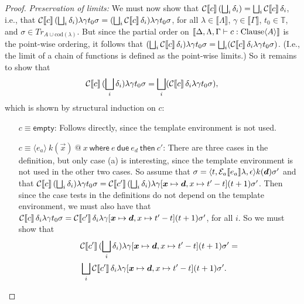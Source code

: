 \documentclass[orivec,final]{llncs-href}
\makeatletter
\newcommand{\timeset}{\mathbb{T}}
\newcommand{\traceset}[1]{\mathit{Tr}_{#1}}
\newcommand{\cod}[1]{\mathrm{cod}(#1)}
\newcommand{\dendom}[1]{\llbracket #1 \rrbracket}
\newcommand{\trace}{\sigma}
\newcommand{\emptychoice}{\epsilon}
\newcommand{\event}[3]{\langle #1,#2,#3\rangle}
\newcommand{\cempty}{\mathsf{empty}}
\newcommand{\catomic}[6]{\langle#1\rangle\ #2\ \textsf{@}\ #3\
  \mathsf{where}\ #4\ \mathsf{due}\ #5\ \mathsf{then}\ #6}
\makeatother
\begin{document}
\begin{proof}
  \emph{Preservation of limits:}
  We must now show that $\mathcal{C}\!\left\llbracket c \right\rrbracket (\bigsqcup_i
    \delta_i)    = \bigsqcup_i\mathcal{C}\!\left\llbracket c \right\rrbracket \delta_i   $,
  i.e., that $\cdenclause{c}{(\bigsqcup_i
    \delta_i)}{\lambda}{\gamma}{t_0}{\trace} = (\bigsqcup_i
  \cdenclause{c}{\delta_i)}{\lambda}{\gamma}{t_0}{\trace}$, for all
  $\lambda \in \dendom{\Lambda}$, $\gamma \in \dendom{\Gamma}$, $t_0
  \in \timeset$, and $\trace \in \traceset{A \cup \cod{\lambda}}$. But since
  the partial order on $\dendom{\ctclause{\Delta}{\Lambda}{\Gamma}{c}{A}}$ is
  the point-wise ordering, it follows that $(\bigsqcup_i
  \cdenclause{c}{\delta_i)}{\lambda}{\gamma}{t_0}{\trace} = \bigsqcup_i
  (\cdenclause{c}{\delta_i}{\lambda}{\gamma}{t_0}{\trace})$. (I.e., the
  limit of a chain of functions is defined as the point-wise limits.) So
  it remains to show that
  \[
  \cdenclause{c}{(\bigsqcup_i
    \delta_i)}{\lambda}{\gamma}{t_0}{\trace} = \bigsqcup_i
  (\cdenclause{c}{\delta_i}{\lambda}{\gamma}{t_0}{\trace}),
  \]
  which is shown by structural induction on $c$:
  \begin{itemize}\itemsep=5pt
  \item[$c \equiv \cempty$:]
    Follows directly, since the template environment is not used.
  \item[$c \equiv \catomic{e_a}{k(\vec{x})}{x}{e}{e_d}{c'}$:]
    There are three cases in the definition, but only case (a) is
    interesting, since the template environment is not used in the other
    two cases. So assume that $\trace =
    \event{t}{\cdenaexp{e_a}{\lambda}}{\emptychoice}{k(\vec{d})}\trace'$
    and that $\cdenclause{c}{(\bigsqcup_i
      \delta_i)}{\lambda}{\gamma}{t_0}{\trace} =
    \cdenclause{c'}{(\bigsqcup_i \delta_i)}{\lambda}{\gamma[\vec{x}
      \mapsto \vec{d}, x \mapsto t' - t]}{(t+1)}{\trace'}$. Then since the
    case tests in the definitions do not depend on the template
    environment, we must also have that
    $\cdenclause{c}{\delta_i}{\lambda}{\gamma}{t_0}{\trace} =
    \cdenclause{c'}{\delta_i}{\lambda}{\gamma[\vec{x} \mapsto \vec{d},
      x \mapsto t' - t]}{(t+1)}{\trace'}$, for all $i$. So we 
    must show that
    \begin{align*}
      &\cdenclause{c'}{(\bigsqcup_i \delta_i)}{\lambda}{\gamma[\vec{x}
        \mapsto \vec{d}, x \mapsto t' - t]}{(t+1)}{\trace'}
      =\\
      &\bigsqcup_i
      \cdenclause{c'}{\delta_i}{\lambda}{\gamma[\vec{x}
        \mapsto \vec{d}, x \mapsto t' - t]}{(t+1)}{\trace'}.
    \end{align*}

\end{itemize}
\end{proof}
\end{document}

